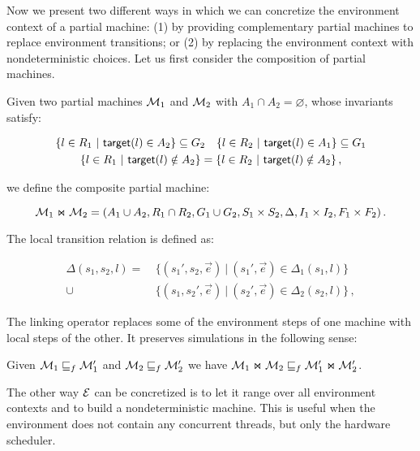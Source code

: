 Now we present two different ways in which
we can concretize the environment context of a partial machine:
(1) by providing complementary partial machines to replace environment transitions;
or (2) by replacing the environment context with nondeterministic choices.
Let us first consider the composition of partial machines.

\begin{definition}
Given two partial machines $\mathcal{M}_1$ and $\mathcal{M}_2$ with
$A_1 \cap A_2 = \varnothing$,
whose invariants satisfy:
\begin{small}
\begin{gather*}
\{ l \in R_1 \ |\ \kw{target}(l) \in A_2 \} \subseteq G_2 \quad
\{ l \in R_2 \ |\ \kw{target}(l) \in A_1 \} \subseteq G_1 \\
\{ l \in R_1 \ |\ \kw{target}(l) \notin A_2 \} = \{ l \in R_2 \ |\ \kw{target}(l) \notin A_2 \}\,,
\end{gather*}
\end{small}%
we define the composite partial machine:
\begin{small}
\[ \mathcal{M}_1 \Join \mathcal{M}_2 =
	(A_1 \cup A_2,
	 R_1 \cap R_2,
	 G_1 \cup G_2,
	 S_1 \times S_2,
	 \Delta,
	 I_1 \times I_2,
	 F_1 \times F_2) \,. \]
\end{small}%
The local transition relation is defined as:
\begin{small}
\begin{align*}
\Delta(s_1, s_2, l) =
	&\ \{ (s_1', s_2, \vec{e}) \ |\ (s_1', \vec{e}) \in \Delta_1(s_1, l) \} \\ \cup
	&\ \{ (s_1, s_2', \vec{e}) \ |\ (s_2', \vec{e}) \in \Delta_2(s_2, l) \} \,,
\end{align*}
\end{small}
\end{definition}

The linking operator replaces some of the environment steps of one machine
with local steps of the other.
It preserves simulations in the following sense:

\begin{lemma}
\label{lemma:mono}
Given $\mathcal{M}_1 \sqsubseteq_f \mathcal{M}_1'$ and $\mathcal{M}_2 \sqsubseteq_f \mathcal{M}_2'$ we have
$\mathcal{M}_1 \Join \mathcal{M}_2 \sqsubseteq_f \mathcal{M}_1' \Join \mathcal{M}_2'$.
\end{lemma}

The other way $\mathcal{E}$ can be concretized
is to let it range over all environment contexts
and to build a nondeterministic machine.
This is useful when the environment
does not contain any concurrent threads,
but only the hardware scheduler.

